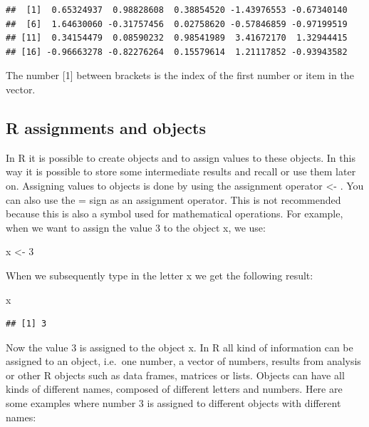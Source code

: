 \documentclass[]{book}
\newenvironment{Shaded}{\begin{snugshade}}{\end{snugshade}}
\newcommand{\DecValTok}[1]{\textcolor[rgb]{0.00,0.00,0.81}{#1}}
\newcommand{\StringTok}[1]{\textcolor[rgb]{0.31,0.60,0.02}{#1}}
\newcommand{\NormalTok}[1]{#1}
\begin{document}
\begin{verbatim}
##  [1]  0.65324937  0.98828608  0.38854520 -1.43976553 -0.67340140
##  [6]  1.64630060 -0.31757456  0.02758620 -0.57846859 -0.97199519
## [11]  0.34154479  0.08590232  0.98541989  3.41672170  1.32944415
## [16] -0.96663278 -0.82276264  0.15579614  1.21117852 -0.93943582
\end{verbatim}

The number {[}1{]} between brackets is the index of the first number or
item in the vector.

\subsection{R assignments and objects}\label{r-assignments-and-objects}

In R it is possible to create objects and to assign values to these
objects. In this way it is possible to store some intermediate results
and recall or use them later on. Assigning values to objects is done by
using the assignment operator \textless{}- . You can also use the = sign
as an assignment operator. This is not recommended because this is also
a symbol used for mathematical operations. For example, when we want to
assign the value 3 to the object x, we use:

\begin{Shaded}
\begin{Highlighting}[]
\NormalTok{x <-}\StringTok{ }\DecValTok{3} 
\end{Highlighting}
\end{Shaded}

When we subsequently type in the letter x we get the following result:

\begin{Shaded}
\begin{Highlighting}[]
\NormalTok{x }
\end{Highlighting}
\end{Shaded}

\begin{verbatim}
## [1] 3
\end{verbatim}

Now the value 3 is assigned to the object x. In R all kind of
information can be assigned to an object, i.e.~one number, a vector of
numbers, results from analysis or other R objects such as data frames,
matrices or lists. Objects can have all kinds of different names,
composed of different letters and numbers. Here are some examples where
number 3 is assigned to different objects with different names:
\end{document}
